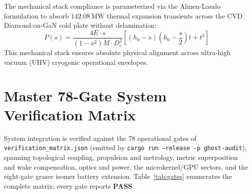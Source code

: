\documentclass[twocolumn,aps,pra,floatfix,superscriptaddress,10pt]{revtex4-2}
\begin{document}
\begin{table}[h!]
\centering
\caption{Mechanical and Thermal Procurement Specifications}
\label{tab:procurement_specs}
\end{table}

The mechanical stack compliance is parameterized via the Almen-Laszlo formulation to absorb $142.08\,\text{MW}$ thermal expansion transients across the CVD Diamond-on-GaN cold plate without delamination:
\begin{equation}
P(s) = \frac{4 E \cdot s}{(1 - \nu^2) M \cdot D_e^2} \left[ (h_0 - s)\left(h_0 - \frac{s}{2}\right) t + t^3 \right]
\label{eq:almen_laszlo}
\end{equation}
This mechanical stack ensures absolute physical alignment across ultra-high vacuum (UHV) cryogenic operational envelopes.

\section{Master 78-Gate System Verification Matrix}

System integration is verified against the 78 operational gates of \texttt{verification\_matrix.json} (emitted by \texttt{cargo run --release -p ghost-audit}), spanning topological coupling, propulsion and metrology, metric superposition and wake compensation, optics and power, the microkernel/GPU sectors, and the eight-gate graser isomer battery extension. Table~\ref{tab:gates} enumerates the complete matrix; every gate reports \textbf{PASS}.
\end{document}
